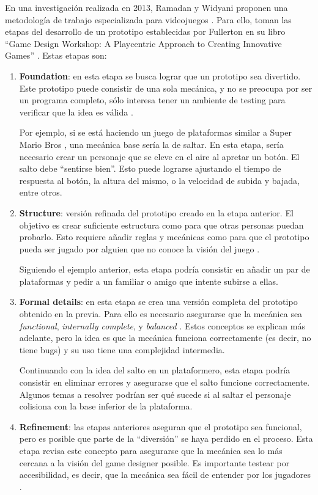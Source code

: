 \par En una investigación realizada en 2013, Ramadan y Widyani proponen una metodología de trabajo especializada para videojuegos \cite{ramadanGameDevelopmentLife2013}. Para ello, toman las etapas del desarrollo de un prototipo establecidas por Fullerton en su libro “Game Design Workshop: A Playcentric Approach to Creating Innovative Games” \cite{fullertonGameDesignWorkshop2008}. Estas etapas son:
\begin{enumerate}
    \item \textbf{Foundation}: en esta etapa se busca lograr que un prototipo sea divertido. Este prototipo puede consistir de una sola mecánica, y no se preocupa por ser un programa completo, sólo interesa tener un ambiente de testing para verificar que la idea es válida \cite{ramadanGameDevelopmentLife2013,fullertonGameDesignWorkshop2008}. \par Por ejemplo, si se está haciendo un juego de plataformas similar a Super Mario Bros \cite{SuperMarioBros2025}, una mecánica base sería la de saltar. En esta etapa, sería necesario crear un personaje que se eleve en el aire al apretar un botón. El salto debe “sentirse bien”. Esto puede lograrse ajustando el tiempo de respuesta al botón, la altura del mismo, o la velocidad de subida y bajada, entre otros.
    \item \textbf{Structure}: versión refinada del prototipo creado en la etapa anterior. El objetivo es crear suficiente estructura como para que otras personas puedan probarlo. Esto requiere añadir reglas y mecánicas como para que el prototipo pueda ser jugado por alguien que no conoce la visión del juego \cite{ramadanGameDevelopmentLife2013,fullertonGameDesignWorkshop2008}. \par Siguiendo el ejemplo anterior, esta etapa podría consistir en añadir un par de plataformas y pedir a un familiar o amigo que intente subirse a ellas.
    \item \textbf{Formal details}:  en esta etapa se crea una versión completa del prototipo obtenido en la previa. Para ello es necesario asegurarse que la mecánica sea \textit{functional}, \textit{internally complete}, y \textit{balanced} \cite{fullertonGameDesignWorkshop2008}. Estos conceptos se explican más adelante, pero la idea es que la mecánica funciona correctamente (es decir, no tiene bugs) y su uso tiene una complejidad intermedia. \par Continuando con la idea del salto en un plataformero, esta etapa podría consistir en eliminar errores y asegurarse que el salto funcione correctamente. Algunos temas a resolver podrían ser qué sucede si al saltar el personaje colisiona con la base inferior de la plataforma.
    \item \textbf{Refinement}: las etapas anteriores aseguran que el prototipo sea funcional, pero es posible que parte de la “diversión” se haya perdido en el proceso. Esta etapa revisa este concepto para asegurarse que la mecánica sea lo más cercana a la visión del game designer posible. Es importante testear por accesibilidad, es decir, que la mecánica sea fácil de entender por los jugadores \cite{ramadanGameDevelopmentLife2013,fullertonGameDesignWorkshop2008}. 
\end{enumerate}
